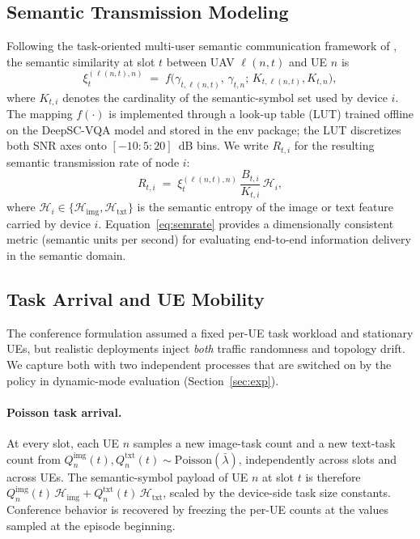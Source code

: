 \subsection{Semantic Transmission Modeling}\label{subsec:sem}
Following the task-oriented multi-user semantic communication framework
of \cite{xie2022taskoriented}, the semantic similarity at slot $t$
between UAV $\ell(n,t)$ and UE $n$ is
\begin{equation}
\xi^{(\ell(n,t),n)}_{t}
\;=\; f\!\big(\gamma_{t,\ell(n,t)},\,\gamma_{t,n};\,K_{t,\ell(n,t)},K_{t,n}\big),
\label{eq:simlut}
\end{equation}
where $K_{t,i}$ denotes the cardinality of the semantic-symbol set used
by device $i$. The mapping $f(\cdot)$ is implemented through a look-up
table (LUT) trained offline on the DeepSC-VQA model
\cite{xie2022taskoriented} and stored in the env package; the LUT
discretizes both SNR axes onto $[-10\!:\!5\!:\!20]$~dB bins. We write
$R_{t,i}$ for the resulting semantic transmission rate of node $i$:
\begin{equation}
R_{t,i} \;=\; \xi^{(\ell(n,t),n)}_t
       \,\frac{B_{t,i}}{K_{t,i}}\,\mathcal{H}_{i},
\label{eq:semrate}
\end{equation}
where $\mathcal{H}_{i}\in\{\mathcal{H}_{\mathrm{img}},\mathcal{H}_{\mathrm{txt}}\}$
is the semantic entropy of the image or text feature carried by device
$i$. Equation~\eqref{eq:semrate} provides a dimensionally consistent
metric (semantic units per second) for evaluating end-to-end information
delivery in the semantic domain.

\subsection{Task Arrival and UE Mobility}\label{subsec:dynamics}
The conference formulation assumed a fixed per-UE task workload and
stationary UEs, but realistic deployments inject \emph{both} traffic
randomness and topology drift. We capture both with two independent
processes that are switched on by the policy in dynamic-mode evaluation
(Section~\ref{sec:exp}).

\paragraph{Poisson task arrival.} At every slot, each UE $n$ samples a
new image-task count and a new text-task count from
$Q^{\mathrm{img}}_{n}(t),Q^{\mathrm{txt}}_{n}(t)\sim
\mathrm{Poisson}(\bar{\lambda})$, independently across slots and across
UEs. The semantic-symbol payload of UE $n$ at slot $t$ is therefore
$Q^{\mathrm{img}}_{n}(t)\,\mathcal{H}_{\mathrm{img}}+
Q^{\mathrm{txt}}_{n}(t)\,\mathcal{H}_{\mathrm{txt}}$, scaled by the
device-side task size constants. Conference behavior is recovered by
freezing the per-UE counts at the values sampled at the episode
beginning.


